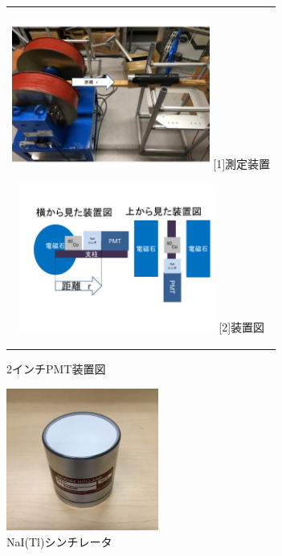 \begin{figure}[h!]
  \begin{center}
    \begin{tabular}{c}
      \begin{minipage}[h]{0.5\hsize}    
        \begin{center}
          \includegraphics[width=6.5cm]{fig/iguchi/2inchsokutei.pdf}
	\hspace{2cm}[1]測定装置
     \end{center}
    \end{minipage}
      \begin{minipage}[h]{0.5\hsize}    
        \begin{center}
          \includegraphics[width=6.5cm]{fig/iguchi/soutizu1.pdf}
         \hspace{2cm}[2]装置図
         \end{center}
        \end{minipage}
     
     \end{tabular}
     \label{souchi}
     \caption{2インチPMT装置図}
    \end{center}
 \end{figure}

\begin{figure}[h]
	\centering
	\includegraphics[width=5cm]{fig/iguchi/NaIscinti.jpg}
	\caption{NaI(Tl)シンチレータ}
	\label{NaIscinti}
\end{figure}

